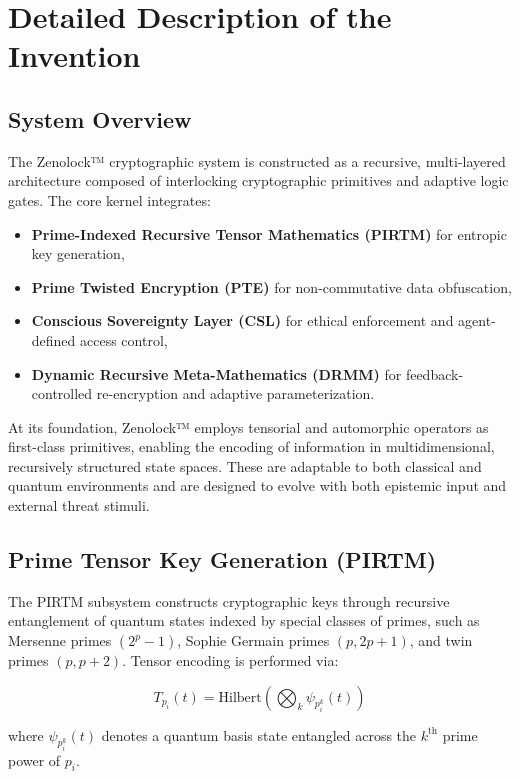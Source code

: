 \documentclass{article}
\theoremstyle{plain}
\begin{document}
\section{Detailed Description of the Invention}

\subsection{System Overview}

The Zenolock™ cryptographic system is constructed as a recursive, multi-layered architecture composed of interlocking cryptographic primitives and adaptive logic gates. The core kernel integrates:

\begin{itemize}
  \item \textbf{Prime-Indexed Recursive Tensor Mathematics (PIRTM)} for entropic key generation,
  \item \textbf{Prime Twisted Encryption (PTE)} for non-commutative data obfuscation,
  \item \textbf{Conscious Sovereignty Layer (CSL)} for ethical enforcement and agent-defined access control,
  \item \textbf{Dynamic Recursive Meta-Mathematics (DRMM)} for feedback-controlled re-encryption and adaptive parameterization.
\end{itemize}

At its foundation, Zenolock™ employs tensorial and automorphic operators as first-class primitives, enabling the encoding of information in multidimensional, recursively structured state spaces. These are adaptable to both classical and quantum environments and are designed to evolve with both epistemic input and external threat stimuli.

\subsection{Prime Tensor Key Generation (PIRTM)}

The PIRTM subsystem constructs cryptographic keys through recursive entanglement of quantum states indexed by special classes of primes, such as Mersenne primes $(2^p - 1)$, Sophie Germain primes $(p, 2p + 1)$, and twin primes $(p, p+2)$. Tensor encoding is performed via:

\[
T_{p_i}(t) = \text{Hilbert} \left( \bigotimes_k \psi_{p_i^k}(t) \right)
\]

where $\psi_{p_i^k}(t)$ denotes a quantum basis state entangled across the $k^{\text{th}}$ prime power of $p_i$.
\end{document}

